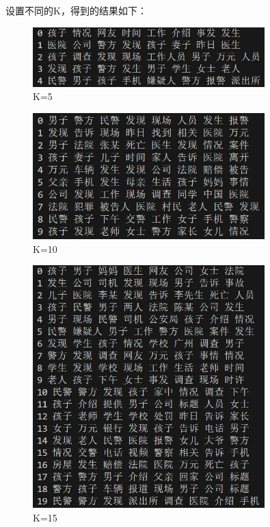 \documentclass[12pt,a4paper]{article}
\begin{document}
\subsection{}
设置不同的K，得到的结果如下：
\begin{figure}[H]
    \centering
    \includegraphics[width=0.8\textwidth]{5_.jpg}
    \caption{K=5}
\end{figure}
\begin{figure}[H]
    \centering
    \includegraphics[width=0.8\textwidth]{10_.jpg}
    \caption{K=10}
\end{figure}
\begin{figure}[H]
    \centering
    \includegraphics[width=0.8\textwidth]{20_.jpg}
    \caption{K=15}
\end{figure}
\end{document}
